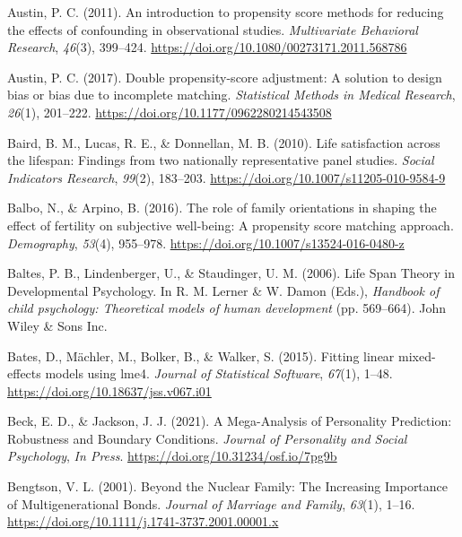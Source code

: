 \documentclass[
  english,
  man, noextraspace]{apa7}
\begin{document}
\leavevmode\hypertarget{ref-austinIntroductionPropensityScore2011}{}%
Austin, P. C. (2011). An introduction to propensity score methods for reducing the effects of confounding in observational studies. \emph{Multivariate Behavioral Research}, \emph{46}(3), 399--424. \url{https://doi.org/10.1080/00273171.2011.568786}

\leavevmode\hypertarget{ref-austinDoublePropensityscoreAdjustment2017}{}%
Austin, P. C. (2017). Double propensity-score adjustment: A solution to design bias or bias due to incomplete matching. \emph{Statistical Methods in Medical Research}, \emph{26}(1), 201--222. \url{https://doi.org/10.1177/0962280214543508}

\leavevmode\hypertarget{ref-bairdLifeSatisfactionLifespan2010}{}%
Baird, B. M., Lucas, R. E., \& Donnellan, M. B. (2010). Life satisfaction across the lifespan: Findings from two nationally representative panel studies. \emph{Social Indicators Research}, \emph{99}(2), 183--203. \url{https://doi.org/10.1007/s11205-010-9584-9}

\leavevmode\hypertarget{ref-balboRoleFamilyOrientations2016}{}%
Balbo, N., \& Arpino, B. (2016). The role of family orientations in shaping the effect of fertility on subjective well-being: A propensity score matching approach. \emph{Demography}, \emph{53}(4), 955--978. \url{https://doi.org/10.1007/s13524-016-0480-z}

\leavevmode\hypertarget{ref-baltesLifeSpanTheory2006}{}%
Baltes, P. B., Lindenberger, U., \& Staudinger, U. M. (2006). Life Span Theory in Developmental Psychology. In R. M. Lerner \& W. Damon (Eds.), \emph{Handbook of child psychology: Theoretical models of human development} (pp. 569--664). John Wiley \& Sons Inc.

\leavevmode\hypertarget{ref-R-lme4}{}%
Bates, D., Mächler, M., Bolker, B., \& Walker, S. (2015). Fitting linear mixed-effects models using lme4. \emph{Journal of Statistical Software}, \emph{67}(1), 1--48. \url{https://doi.org/10.18637/jss.v067.i01}

\leavevmode\hypertarget{ref-beckMegaAnalysisPersonalityPrediction2021}{}%
Beck, E. D., \& Jackson, J. J. (2021). A Mega-Analysis of Personality Prediction: Robustness and Boundary Conditions. \emph{Journal of Personality and Social Psychology}, \emph{In Press}. \url{https://doi.org/10.31234/osf.io/7pg9b}

\leavevmode\hypertarget{ref-bengtsonNuclearFamilyIncreasing2001}{}%
Bengtson, V. L. (2001). Beyond the Nuclear Family: The Increasing Importance of Multigenerational Bonds. \emph{Journal of Marriage and Family}, \emph{63}(1), 1--16. \url{https://doi.org/10.1111/j.1741-3737.2001.00001.x}
\end{document}
